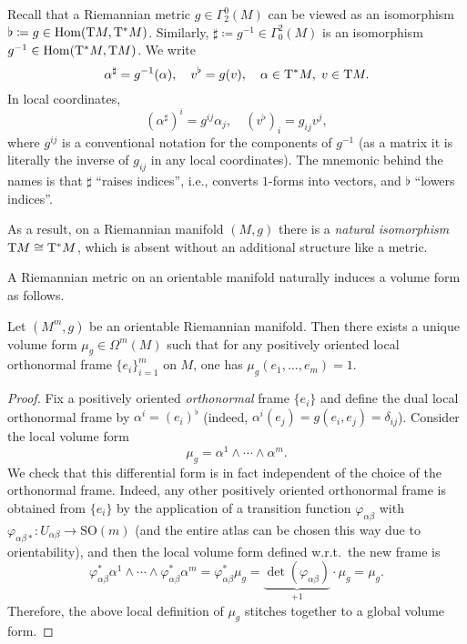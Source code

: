 \begin{defn}
    Recall that a Riemannian metric $g\in\Gamma^0_2(M)$ can be viewed as an isomorphism $\flat\coloneqq g\in\operatorname{Hom}(\mathrm{T} M,\mathrm{T}^\ast M)$. Similarly, $\sharp\coloneqq g^{-1}\in\Gamma_0^2(M)$ is an isomorphism $g^{-1}\in\operatorname{Hom}(\mathrm{T}^\ast M,\mathrm{T} M)$. We write 
    \[\alpha^\sharp=g^{-1}(\alpha),\quad v^\flat=g(v),\quad \alpha\in \mathrm{T}^\ast M,\;v\in \mathrm{T} M.\]
    In local coordinates,
    \[(\alpha^\sharp)^i=g^{ij}\alpha_j,\quad (v^\flat)_i=g_{ij}v^j,\]
    where $g^{ij}$ is a conventional notation for the components of $g^{-1}$ (as a matrix it is literally the inverse of $g_{ij}$ in any local coordinates). The mnemonic behind the names is that $\sharp$ ``raises indices'', i.e., converts $1$-forms into vectors, and $\flat$ ``lowers indices''.
    
    As a result, on a Riemannian manifold $(M,g)$ there is a \emph{natural isomorphism} $\mathrm{T} M\cong \mathrm{T}^\ast M$, which is absent without an additional structure like a metric.
\end{defn}


A Riemannian metric on an orientable manifold naturally induces a volume form as follows.


\begin{thm}
    Let $(M^m,g)$ be an orientable Riemannian manifold. Then there exists a unique volume form $\mu_g\in\Omega^m(M)$ such that for any positively oriented local orthonormal frame $\{e_i\}_{i=1}^m$ on $M$, one has $\mu_g(e_1,\ldots,e_m)=1$.
\end{thm}
\begin{proof}
    Fix a positively oriented \emph{orthonormal} frame $\{e_i\}$ and define the dual local orthonormal frame by $\alpha^i=(e_i)^\flat$ (indeed, $\alpha^i(e_j)=g(e_i,e_j)=\delta_{ij}$). Consider the local volume form
    \[\mu_g=\alpha^1\wedge \cdots\wedge \alpha^m.\]
    We check that this differential form is in fact independent of the choice of the orthonormal frame. Indeed, any other positively oriented orthonormal frame is obtained from $\{e_i\}$ by the application of a transition function $\varphi_{\alpha\beta}$ with $\varphi_{\alpha\beta\ast}:U_{\alpha\beta}\to \mathrm{SO}(m)$ (and the entire atlas can be chosen this way due to orientability), and then the local volume form defined w.r.t.\ the new frame is
    \[\varphi_{\alpha\beta}^\ast\alpha^1\wedge\cdots\wedge\varphi_{\alpha\beta}^\ast\alpha^m=\varphi_{\alpha\beta}^\ast \mu_g=\underbrace{\det(\varphi_{\alpha\beta})}_{+1}\cdot\mu_g=\mu_g.\]
    Therefore, the above local definition of $\mu_g$ stitches together to a global volume form.
\end{proof}

